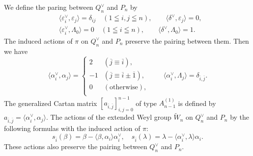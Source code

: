 \documentclass[12pt,twoside]{article}
\newcommand\tW{{\widetilde W}}
\newcommand\av{\alpha^\vee}
\newcommand\eps{\varepsilon}
\newcommand\epsv{\eps^\vee}
\newcommand\deltav{\delta^\vee}
\newcommand\Qv{Q^\vee}
\newcommand\bra{\langle}
\newcommand\ket{\rangle}
\theoremstyle{plain} %
\theoremstyle{definition} %
\theoremstyle{definition} %
\numberwithin{theorem}{section}
\numberwithin{equation}{section}
\numberwithin{figure}{section}
\numberwithin{table}{section}
\begin{document}
We define the paring between $\Qv_n$ and $P_n$ by
\begin{align*}
 &
 \bra\epsv_i,\eps_j\ket = \delta_{ij} \quad (1\leqq i,j\leqq n), \qquad
 \bra\deltav,\eps_j\ket = 0,
 \\ &
 \bra\epsv_i,\Lambda_0\ket = 0 \quad (1\leqq i\leqq n), \qquad
 \bra\deltav,\Lambda_0\ket = 1.
\end{align*}
The induced actions of $\pi$ on $\Qv_n$ and $P_n$ 
preserve the pairing between them. 
Then we have
\begin{equation*}
 \bra\av_i,\alpha_j\ket =
 \begin{cases}
   2 & (\overline{j}\equiv\overline{i}), \\
  -1 & (\overline{j}\equiv\overline{i}\pm\overline{1}), \\
   0 & (\text{otherwise}), \\
 \end{cases}
 \qquad
 \bra\av_i,\Lambda_j\ket = \delta_{\overline{i},\overline{j}}.
\end{equation*}
The generalized Cartan matrix $[a_{\overline{i},\overline{j}}]_{i,j=0}^{n-1}$
of type $A^{(1)}_{n-1}$ is defined by 
$a_{\overline{i},\overline{j}} = \bra\av_i,\alpha_j\ket$.
The actions of the extended Weyl group $\tW_n$ on $\Qv_n$ and $P_n$
by the following formulas with the induced action of $\pi$:
\begin{equation*}
 s_{\overline{i}}(\beta) = \beta - \bra\beta,\alpha_i\ket\av_i, \quad
 s_{\overline{i}}(\lambda) = \lambda - \bra\av_i,\lambda\ket\alpha_i.
\end{equation*}
These actions also preserve the pairing between $\Qv_n$ and $P_n$. 
\end{document}
